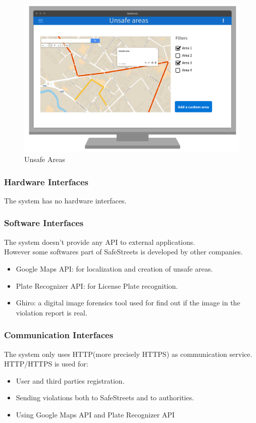 \documentclass{article}
\begin{document}
\begin{figure}[H]
    \centering
    \includegraphics[scale=0.35]{Images/WEBUnsafeAreas}
    \caption{Unsafe Areas}
\end{figure}
\newpage
\newpage
\subsubsection{Hardware Interfaces}
The system has no hardware interfaces.
\subsubsection{Software Interfaces}
The system doesn't provide any API to external applications.\\
However some softwares part of SafeStreets is developed by other companies.
\begin{itemize}
    \item Google Maps API: for localization and creation of unsafe areas.
    \item Plate Recognizer API: for License Plate recognition.
    \item Ghiro: a digital image forensics tool used for find out if the image
    in the violation report is real.
\end{itemize}
\subsubsection{Communication Interfaces}
The system only uses HTTP(more precisely HTTPS) as communication service.
HTTP/HTTPS is used for:
\begin{itemize}
    \item User and third parties registration.
    \item Sending violations both to SafeStreets and to authorities.
    \item Using Google Maps API and Plate Recognizer API
\end{itemize}
\end{document}
